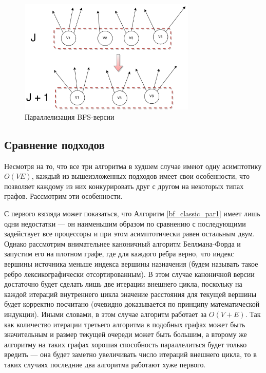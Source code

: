 \begin{figure}[h]
\caption{Параллелизация BFS-версии}
\label{bf_par_3}
\centering
\includegraphics[width=0.75\textwidth]{img/bf_par_3.png}
\end{figure}

\FloatBarrier
\subsection{Сравнение подходов}
Несмотря на то, что все три алгоритма в худшем случае имеют одну асимптотику  $O(VE)$, каждый из вышеизложенных подходов имеет свои особенности, что позволяет каждому из них конкурировать друг с другом на некоторых типах графов. Рассмотрим эти особенности.

С первого взгляда может показаться, что Алгоритм \ref{bf_classic_par1} имеет лишь одни недостатки --- он наименьшим образом по сравнению с последующими задействует все процессоры и при этом асимптотически равен остальным двум. Однако рассмотрим внимательнее каноничный алгоритм Беллмана-Форда и запустим его на плотном графе, где для каждого ребра верно, что индекс вершины источника меньше индекса вершины назначения (будем называть такое ребро лексикографически отсортированным). В этом случае каноничной версии достаточно будет сделать лишь две итерации внешнего цикла, поскольку на каждой итераций внутреннего цикла значение расстояния для текущей вершины будет корректно посчитано (очевидно доказывается по принципу математической индукции). Иными словами, в этом случае алгоритм работает за $O(V + E)$. Так как количество итерации третьего алгоритма в подобных графах может быть значительным и размер текущей очереди может быть большим, а второму же алгоритму на таких графах хорошая способность параллелиться будет только вредить --- она будет заметно увеличивать число итераций внешнего цикла, то в таких случаях последние два алгоритма работают хуже первого.   

